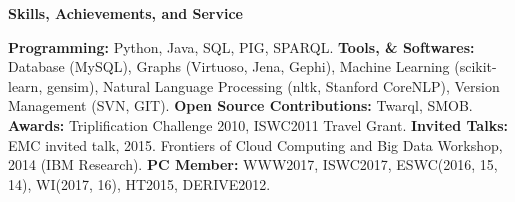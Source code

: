 \documentclass[letterpaper,10pt]{article}
\newcommand{\resheading}[1]{{\colorbox{mygrey}{\begin{minipage}{\textwidth}{\textbf{#1 \vphantom{p\^{E}}}}\end{minipage}}}}
\begin{document}
\resheading{Skills, Achievements, and Service}\vspace{0.05in}
\textbf{Programming:} Python, Java, SQL, PIG, SPARQL.\linebreak
\textbf{Tools, \& Softwares:} Database (MySQL), Graphs (Virtuoso, Jena, Gephi), Machine Learning (scikit-learn, gensim), Natural Language Processing (nltk, Stanford CoreNLP), Version Management (SVN, GIT).\linebreak
\textbf{Open Source Contributions:} Twarql, SMOB.\linebreak 
\textbf{Awards: }Triplification Challenge 2010, ISWC2011 Travel Grant. \linebreak
\textbf{Invited Talks:} EMC invited talk, 2015. Frontiers of Cloud Computing and Big Data Workshop, 2014 (IBM Research). \linebreak
\textbf{PC Member: } WWW2017, ISWC2017, ESWC(2016, 15, 14), WI(2017, 16), HT2015, DERIVE2012.\vspace{0.05in}
\end{document}
